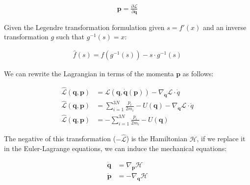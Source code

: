 \documentclass[draft]{agujournal2019}
\begin{document}
\begin{align}
    \mathbf{p} = \frac{\partial \mathcal{L}}{\partial \mathbf{q}}
\end{align}

Given the Legendre transformation formulation given $s = f'(x)$ and an inverse transformation $g$ such that $g^{-1}(s) = x$:

\begin{align}
    \hat{f}(s) = f(g^{-1}(s)) - s \cdot g^{-1}(s)
\end{align}

We can rewrite the Lagrangian in terms of the momenta $\mathbf{p}$ as follows:

\begin{align}
    \hat{\mathcal{L}}(\mathbf{q}, \mathbf{p}) &= \mathcal{L}(\mathbf{q}, \dot{\mathbf{q}}(\mathbf{p})) - \nabla_{\dot{\mathbf{q}}} \mathcal{L} \cdot \dot{q} \\
    \hat{\mathcal{L}}(\mathbf{q}, \mathbf{p}) &= \sum_{i = 1}^{3N} \frac{p_i}{2m_i} - U(\mathbf{q}) - \nabla_{\dot{\mathbf{q}}} \mathcal{L} \cdot \dot{q} \\
    \hat{\mathcal{L}}(\mathbf{q}, \mathbf{p}) &= - \sum_{i = 1}^{3N} \frac{p_i}{2m_i} - U(\mathbf{q})
\end{align}

The negative of this transformation ($-\hat{\mathcal{L}}$) is the Hamiltonian $\mathcal{H}$, if we replace it in the Euler-Lagrange equations, we can induce the mechanical equations:

\begin{align}
    \dot{\mathbf{q}} &= \nabla_\mathbf{p} \mathcal{H} \\
    \dot{\mathbf{p}} &= - \nabla_\mathbf{q} \mathcal{H}
\end{align}
\end{document}
